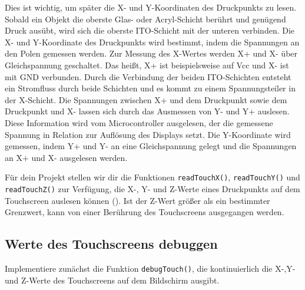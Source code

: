 Dies ist wichtig, um später die X- und Y-Koordinaten des Druckpunkts zu lesen.
Sobald ein Objekt die oberste Glas- oder Acryl-Schicht berührt und genügend Druck ausübt, wird sich die oberste ITO-Schicht mit der unteren verbinden.
Die X- und Y-Koordinate des Druckpunkts wird bestimmt, indem die Spannungen an den Polen gemessen werden.
Zur Messung des X-Wertes werden X+ und X- über Gleichspannung geschaltet.
Das heißt, X+ ist beispielsweise auf Vcc und X- ist mit GND verbunden.
Durch die Verbindung der beiden ITO-Schichten entsteht ein Stromfluss durch beide Schichten und es kommt zu einem Spannungsteiler in der X-Schicht.
Die Spannungen zwischen X+ und dem Druckpunkt sowie dem Druckpunkt und X- lassen sich durch das Ausmessen von Y- und Y+ auslesen.
Diese Information wird vom Microcontroller ausgelesen, der die gemessene Spannung in Relation zur Auflösung des Displays setzt.
Die Y-Koordinate wird gemessen, indem Y+ und Y- an eine Gleichspannung gelegt und die Spannungen an X+ und X- ausgelesen werden.

Für dein Projekt stellen wir dir die Funktionen \lstinline|readTouchX()|, \lstinline|readTouchY()| und \lstinline|readTouchZ()| zur Verfügung, die X-, Y- und Z-Werte eines Druckpunkts auf dem Touchscreen auslesen können ().
Ist der Z-Wert größer als ein bestimmter Grenzwert, kann von einer Berührung des Touchscreens ausgegangen werden. 


\subsection{Werte des Touchscreens debuggen}
Implementiere zunächst die Funktion \lstinline|debugTouch()|, die kontinuierlich die X-,Y- und Z-Werte des Touchscreens auf dem Bildschirm ausgibt.

